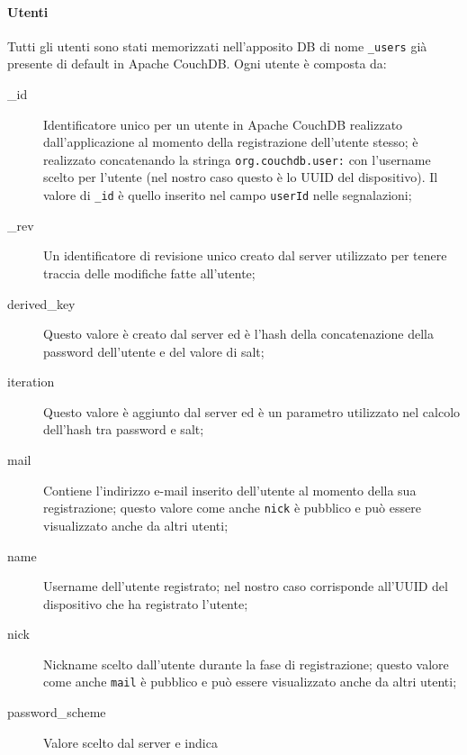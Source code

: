                 \paragraph{Utenti}
                Tutti gli utenti sono stati memorizzati nell'apposito DB di
                nome \texttt{\_users} già presente di default in Apache
                CouchDB\texttrademark{}. Ogni utente è composta da:
                \begin{description}
                    \item[\_id] Identificatore unico per un utente in Apache
                    CouchDB\texttrademark{} realizzato dall'applicazione al
                    momento della registrazione dell'utente stesso; è
                    realizzato concatenando la stringa
                    \texttt{org.couchdb.user:} con l'username scelto per
                    l'utente (nel nostro caso questo è lo UUID del dispositivo).
                    Il valore di \texttt{\_id} è quello inserito nel campo
                    \texttt{userId} nelle segnalazioni;
                    \item[\_rev] Un identificatore di revisione unico creato
                    dal server utilizzato per tenere traccia delle modifiche
                    fatte all'utente;
                    \item[derived\_key] Questo valore è creato dal server ed
                    è l'hash della concatenazione della password dell'utente e
                    del valore di salt;
                    \item[iteration] Questo valore è aggiunto dal server ed è
                    un parametro utilizzato nel calcolo dell'hash tra password
                    e salt;
                    \item[mail] Contiene l'indirizzo e-mail inserito
                    dell'utente al momento della sua registrazione; questo
                    valore come anche \texttt{nick} è pubblico e può essere
                    visualizzato anche da altri utenti;
                    \item[name] Username dell'utente registrato; nel nostro
                    caso corrisponde all'UUID del dispositivo che ha
                    registrato l'utente;
                    \item[nick] Nickname scelto dall'utente durante la fase di
                    registrazione; questo valore come anche \texttt{mail} è
                    pubblico e può essere visualizzato anche da altri utenti;
                    \item[password\_scheme] Valore scelto dal server e indica

\end{description}
